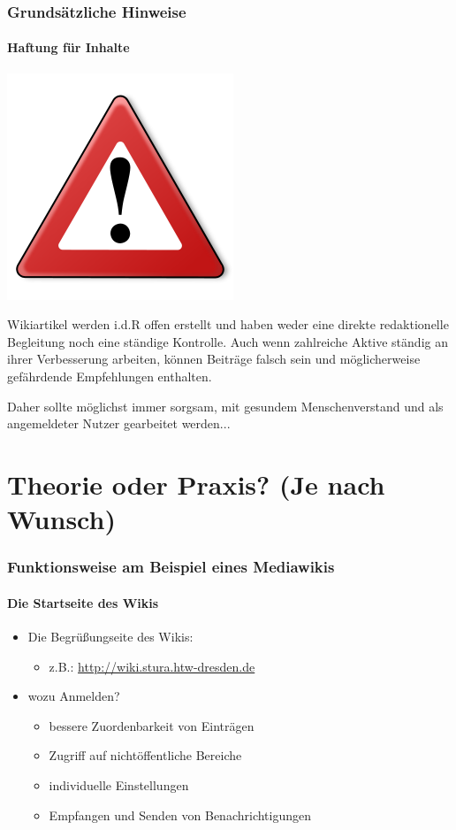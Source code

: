 \documentclass{beamer}
\begin{document}
\begin{frame}
  \frametitle{Grundsätzliche Hinweise}
  \framesubtitle{Haftung für Inhalte}

  \begin{center}
    \includegraphics[scale=0.25]{Warning_256px}
  \end{center}
 
  Wikiartikel werden i.d.R offen erstellt und haben weder eine direkte
  redaktionelle Begleitung noch eine ständige Kontrolle. Auch wenn zahlreiche
  Aktive ständig an ihrer Verbesserung arbeiten, können Beiträge falsch sein und
  möglicherweise gefährdende Empfehlungen enthalten.

  \bigskip

  Daher sollte möglichst immer sorgsam, mit gesundem
  Menschenverstand und als angemeldeter Nutzer gearbeitet werden...
\end{frame}

\section{Theorie oder Praxis? (Je nach Wunsch)}

\begin{frame}
  \frametitle{Funktionsweise am Beispiel eines Mediawikis}
  \framesubtitle{Die Startseite des Wikis}

  \begin{itemize}[<+->]
    \item Die Begrüßungseite des Wikis:
    \begin{itemize}
      \item z.B.: \url{http://wiki.stura.htw-dresden.de}
    \end{itemize}
    \item wozu Anmelden?
    \begin{itemize}
      \item bessere Zuordenbarkeit von Einträgen
      \item Zugriff auf nichtöffentliche Bereiche
      \item individuelle Einstellungen
      \item Empfangen und Senden von Benachrichtigungen
    \end{itemize}
  \end{itemize}
\end{frame}
\end{document}
